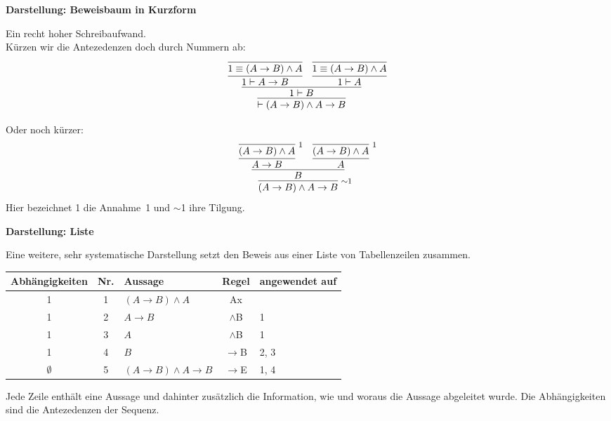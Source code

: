 \documentclass[8pt]{beamer}
\newcommand{\strong}[1]{\textsf{\textbf{#1}}}
\newcommand{\infernote}[1]{\!\text{\footnotesize #1}}
\newcommand{\discharge}[1]{$\sim$#1}
\newcommand{\cond}{\rightarrow}
\begin{document}
\begin{frame}[t]
\strong{Darstellung: Beweisbaum in Kurzform}

\vspace{3em}
Ein recht hoher Schreibaufwand.\pause{}\\
Kürzen wir die Antezedenzen doch durch Nummern ab:
\[\infer{\vdash (A\cond B)\land A\cond B}{
  \infer{1\vdash B}{
    \infer{1\vdash A\cond B}{
      \infer{1\equiv (A\cond B)\land A}{}}
  & \infer{1\vdash A}{
      \infer{1\equiv (A\cond B)\land A}{}}}}\]\pause

Oder noch kürzer:
\[\infer[\infernote{\discharge 1}]{(A\cond B)\land A\cond B}{
  \infer{B}{
    \infer{A\cond B}{
      \infer[\infernote{1}]{(A\cond B)\land A}{}}
  & \infer{A}{
      \infer[\infernote{1}]{(A\cond B)\land A}{}}}}\]
Hier bezeichnet 1 die Annahme~1 und \discharge{1} ihre Tilgung.
\end{frame}

\begin{frame}[t]
\strong{Darstellung: Liste}

\vspace{3em}
Eine weitere, sehr systematische Darstellung setzt den Beweis aus
einer Liste von Tabellenzeilen zusammen.

\vspace{1em}
\begin{center}
\begin{tabular}{cclcl}
\toprule
\strong{\small Abhängigkeiten} & \strong{\small Nr.}
& \strong{\small Aussage} & \strong{\small Regel}
& \strong{\small angewendet auf}\\
\midrule
1 & 1 & $(A\cond B)\land A$ & Ax &\\
1 & 2 & $A\cond B$ & $\land$B & 1\\
1 & 3 & $A$ & $\land$B & 1\\
1 & 4 & $B$ & $\cond$B & 2, 3\\
$\emptyset$ & 5 & $(A\cond B)\land A\cond B$ & $\cond$E & 1, 4\\
\bottomrule
\end{tabular}
\end{center}\pause

\vspace{1em}
Jede Zeile enthält eine Aussage und dahinter zusätzlich die
Information, wie und woraus die Aussage abgeleitet wurde.
Die Abhängigkeiten sind die Antezedenzen der Sequenz.
\end{frame}
\end{document}
